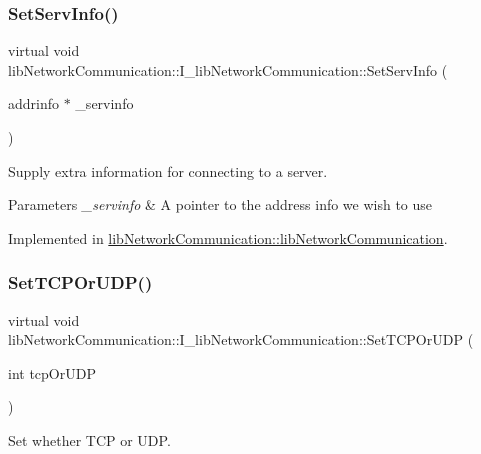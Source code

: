 \subsubsection{\texorpdfstring{SetServInfo()}{SetServInfo()}}
{\footnotesize\ttfamily virtual void lib\+Network\+Communication\+::\+I\+\_\+lib\+Network\+Communication\+::\+Set\+Serv\+Info (\begin{DoxyParamCaption}\item[{addrinfo $\ast$}]{\+\_\+servinfo }\end{DoxyParamCaption})\hspace{0.3cm}{\ttfamily [pure virtual]}}



Supply extra information for connecting to a server. 


\begin{DoxyParams}{Parameters}
{\em \+\_\+servinfo} & A pointer to the address info we wish to use \\
\hline
\end{DoxyParams}


Implemented in \mbox{\hyperlink{classlibNetworkCommunication_1_1libNetworkCommunication_a5b95053e05ce720b7f18d275c65d6965}{lib\+Network\+Communication\+::lib\+Network\+Communication}}.

\mbox{\label{classlibNetworkCommunication_1_1I__libNetworkCommunication_a66c9c4992979e7ccc7a2575a21ef3bf0}} 
\subsubsection{\texorpdfstring{SetTCPOrUDP()}{SetTCPOrUDP()}}
{\footnotesize\ttfamily virtual void lib\+Network\+Communication\+::\+I\+\_\+lib\+Network\+Communication\+::\+Set\+T\+C\+P\+Or\+U\+DP (\begin{DoxyParamCaption}\item[{int}]{tcp\+Or\+U\+DP }\end{DoxyParamCaption})\hspace{0.3cm}{\ttfamily [pure virtual]}}



Set whether T\+CP or U\+DP. 


